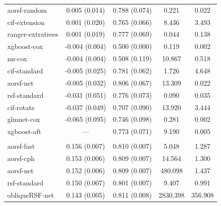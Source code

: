 \documentclass[twoside,11pt]{article}\usepackage[]{graphicx}\usepackage[]{xcolor}
\newenvironment{knitrout}{}{} %
\begin{document}
\begin{knitrout}
\begin{longtable}[t]{lcccc}
\hspace{1em}aorsf-random & 0.005 (0.014) & 0.788 (0.074) & 0.221 & 0.022\\
\hspace{1em}cif-extension & 0.001 (0.020) & 0.765 (0.066) & 8.436 & 3.493\\
\hspace{1em}ranger-extratrees & 0.001 (0.019) & 0.777 (0.069) & 0.044 & 0.138\\
\hspace{1em}xgboost-cox & -0.004 (0.004) & 0.500 (0.000) & 0.119 & 0.002\\
\hspace{1em}nn-cox & -0.004 (0.004) & 0.508 (0.119) & 10.867 & 0.518\\
\hspace{1em}cif-standard & -0.005 (0.025) & 0.781 (0.062) & 1.726 & 4.648\\
\hspace{1em}aorsf-net & -0.005 (0.032) & 0.806 (0.067) & 13.309 & 0.022\\
\hspace{1em}rsf-standard & -0.031 (0.051) & 0.776 (0.073) & 0.090 & 0.035\\
\hspace{1em}cif-rotate & -0.037 (0.049) & 0.707 (0.090) & 13.920 & 3.444\\
\hspace{1em}glmnet-cox & -0.065 (0.095) & 0.746 (0.098) & 0.281 & 0.002\\
\hspace{1em}xgboost-aft & --- & 0.773 (0.071) & 9.190 & 0.005\\
\addlinespace[0.3em]
\multicolumn{5}{l}{\textit{\textbf{ARIC; coronary heart disease, n = 13623, p = 41}}}\\
\hline
\hspace{1em}aorsf-fast & 0.156 (0.007) & 0.810 (0.007) & 5.048 & 1.287\\
\hspace{1em}aorsf-cph & 0.153 (0.006) & 0.809 (0.007) & 14.564 & 1.300\\
\hspace{1em}aorsf-net & 0.152 (0.006) & 0.809 (0.007) & 480.098 & 1.437\\
\hspace{1em}rsf-standard & 0.150 (0.007) & 0.801 (0.007) & 9.407 & 0.991\\
\hspace{1em}obliqueRSF-net & 0.143 (0.005) & 0.811 (0.008) & 2830.398 & 356.908\\

\end{longtable}
\end{knitrout}
\end{document}
